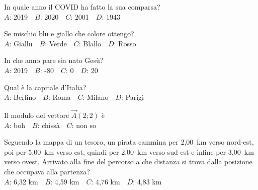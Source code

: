 \mcquestionfooter



\def\mcquestionnumber{11}


\mcquestionheader In quale anno il COVID ha fatto la sua comparsa?\\
{$A$}: 2019\ \ {$B$}: 2020\ \ {$C$}: 2001\ \ {$D$}: 1943\ \ 

\mcquestionfooter



\def\mcquestionnumber{12}


\mcquestionheader Se mischio blu e giallo che colore ottengo?\\
{$A$}: Giallu\ \ {$B$}: Verde\ \ {$C$}: Blallo\ \ {$D$}: Rosso\ \ 

\mcquestionfooter



\mcpaperfooter

\def\mcserialnumber{18}
\mcpaperheader


\def\mcquestionnumber{1}


\mcquestionheader In che anno pare sia nato Gesù?\\
{$A$}: 2019\ \ {$B$}: -80\ \ {$C$}: 0\ \ {$D$}: 20\ \ 

\mcquestionfooter



\def\mcquestionnumber{2}


\mcquestionheader Qual è la capitale d’Italia?\\
{$A$}: Berlino\ \ {$B$}: Roma\ \ {$C$}: Milano\ \ {$D$}: Parigi\ \ 

\mcquestionfooter



\def\mcquestionnumber{3}


\mcquestionheader Il modulo del vettore $\vec{A}(2;2)$ è\\
{$A$}: boh\ \ {$B$}: chissà\ \ {$C$}: non so\ \ 

\mcquestionfooter



\def\mcquestionnumber{4}


\mcquestionheader Seguendo la mappa di un tesoro, un pirata cammina per 2,00~km verso nord-est, poi per 5,00~km verso est, quindi per 2,00~km verso sud-est e infine per 3,00~km verso ovest. Arrivato alla fine del percorso a che distanza si trova dalla posizione che occupava alla partenza?\\
{$A$}: 6,32 km\ \ {$B$}: 4,59 km\ \ {$C$}: 4,76 km\ \ {$D$}: 4,83 km\ \ 

\mcquestionfooter



